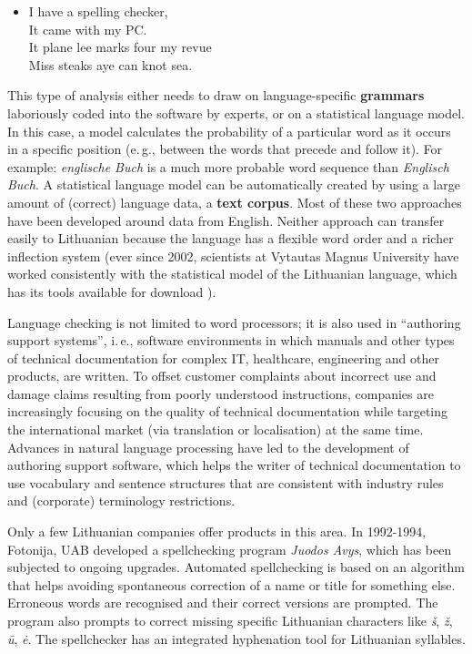 \begin{multicols}{2}
\begin{itemize}
\item[]  I have a spelling checker,\\
  It came with my PC.\\
  It plane lee marks four my revue\\
  Miss steaks aye can knot sea.
\end{itemize}

This type of analysis either needs to draw on language-specific \textbf{grammars} laboriously coded into the software by experts, or on a statistical language model. In this case, a model calculates the probability of a particular word as it occurs in a specific position (e.\,g., between the words that precede and follow it). For example: \textit{englische Buch} is a much more probable word sequence than \textit{Englisch Buch}. A statistical language model can be automatically created by using a large amount of (correct) language data, a \textbf{text corpus}. Most of these two approaches have been developed around data from English. Neither approach can transfer easily to Lithuanian because the language has a flexible word order and a richer inflection system (ever since 2002, scientists at Vytautas Magnus University have worked consistently with the statistical model of the Lithuanian language, which has its tools available for download \cite{airenas}).

Language checking is not limited to word processors; it is also used in “authoring support systems”, i.\,e., software environments in which manuals and other types of technical documentation for complex IT, healthcare, engineering and other products, are written. To offset customer complaints about incorrect use and damage claims resulting from poorly understood instructions, companies are increasingly focusing on the quality of technical documentation while targeting the international market (via translation or localisation) at the same time. Advances in natural language processing have led to the development of authoring support software, which helps the writer of technical documentation to use vocabulary and sentence structures that are consistent with industry rules and (corporate) terminology restrictions.


Only a few Lithuanian companies offer products in this area. In 1992-1994, Fotonija, UAB developed a spellchecking program \textit{Juodos Avys}, which has been subjected to ongoing upgrades. Automated spellchecking is based on an algorithm that helps avoiding spontaneous correction of a name or title for something else. Erroneous words are recognised and their correct versions are prompted. The program also prompts to correct missing specific Lithuanian characters like \textit{š}, \textit{ž},  \textit{ū}, \textit{ė}. The spellchecker has an integrated hyphenation tool for Lithuanian syllables.


\end{multicols}
